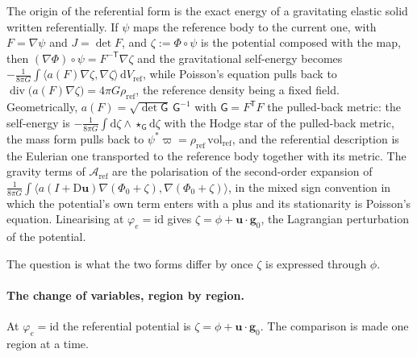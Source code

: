 \documentclass[11pt]{article}
\theoremstyle{definition}
\theoremstyle{remark}
\newcommand{\bu}{\mathbf{u}}
\newcommand{\Div}{\operatorname{div}}
\newcommand{\vol}{\mathrm{vol}}
\begin{document}
The origin of the referential form is the exact energy of a
gravitating elastic solid written referentially. If $\psi$ maps the
reference body to the current one, with $F = \nabla\psi$ and $J = \det
F$, and $\zeta := \Phi\circ\psi$ is the potential composed with the
map, then $(\nabla\Phi)\circ\psi = F^{-\mathsf T}\nabla\zeta$ and the
gravitational self-energy becomes $-\tfrac{1}{8\pi G}\int\langle
a(F)\nabla\zeta, \nabla\zeta\rangle\,\mathrm dV_{\mathrm{ref}}$, while
Poisson's equation pulls back to $\Div\bigl(a(F)\nabla\zeta\bigr) =
4\pi G\rho_{\mathrm{ref}}$, the reference density being a fixed field.
Geometrically, $a(F) = \sqrt{\det\mathsf G}\,\mathsf G^{-1}$ with
$\mathsf G = F^{\mathsf T}F$ the pulled-back metric: the self-energy is
$-\tfrac{1}{8\pi G}\int\mathrm d\zeta\wedge\star_{\mathsf G}\mathrm
d\zeta$ with the Hodge star of the pulled-back metric, the mass form
pulls back to $\psi^*\varpi = \rho_{\mathrm{ref}}\,\vol_{\mathrm{ref}}$,
and the referential description is the Eulerian one transported to the
reference body together with its metric. The gravity terms of
$\mathcal A_{\mathrm{ref}}$ are the polarisation of the second-order
expansion of $\tfrac{1}{8\pi G}\int\langle a(I + \mathrm
D\bu)\nabla(\Phi_0 + \zeta), \nabla(\Phi_0 + \zeta)\rangle$, in the
mixed sign convention in which the potential's own term enters with a
plus and its stationarity is Poisson's equation. Linearising at
$\varphi_e = \mathrm{id}$ gives $\zeta = \phi + \bu\cdot\mathbf g_0$,
the Lagrangian perturbation of the potential.

The question is what the two forms differ by once $\zeta$ is expressed
through $\phi$.

\paragraph{The change of variables, region by region.} At $\varphi_e
= \mathrm{id}$ the referential potential is $\zeta = \phi +
\bu\cdot\mathbf g_0$. The comparison is made one region at a time.
\end{document}
